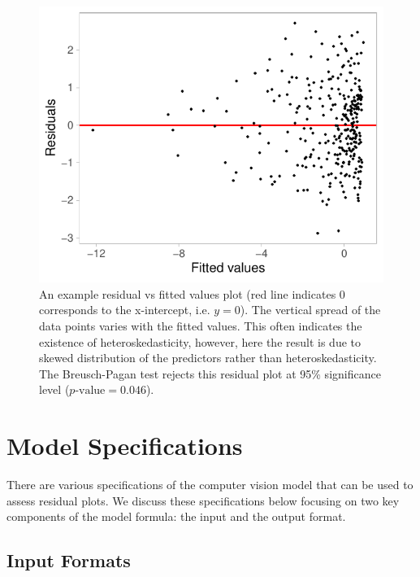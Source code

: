 \documentclass[]{interact}
\theoremstyle{plain}%
\theoremstyle{definition}
\theoremstyle{remark}
\begin{document}
\begin{figure}[!h]

{\centering \includegraphics[width=1\linewidth]{paper_files/figure-latex/false-finding-1} 

}

\caption{An example residual vs fitted values plot (red line indicates 0 corresponds to the x-intercept, i.e. $y=0$). The vertical spread of the data points varies with the fitted values. This often indicates the existence of heteroskedasticity, however, here the result is due to skewed distribution of the predictors rather than heteroskedasticity. The Breusch-Pagan test rejects this residual plot at 95\% significance level ($p\text{-value} = 0.046$).}\label{fig:false-finding}
\end{figure}

\section{Model Specifications}\label{sec-model-specifications}

There are various specifications of the computer vision model that can
be used to assess residual plots. We discuss these specifications below
focusing on two key components of the model formula: the input and the
output format.

\subsection{Input Formats}\label{input-formats}
\end{document}
